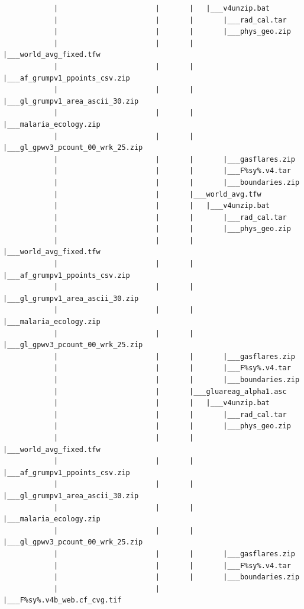\documentclass[]{book}
\begin{document}
\begin{verbatim}
            |                       |       |   |___v4unzip.bat
            |                       |       |       |___rad_cal.tar
            |                       |       |       |___phys_geo.zip
            |                       |       |       |___world_avg_fixed.tfw
            |                       |       |       |___af_grumpv1_ppoints_csv.zip
            |                       |       |       |___gl_grumpv1_area_ascii_30.zip
            |                       |       |       |___malaria_ecology.zip
            |                       |       |       |___gl_gpwv3_pcount_00_wrk_25.zip
            |                       |       |       |___gasflares.zip
            |                       |       |       |___F%sy%.v4.tar
            |                       |       |       |___boundaries.zip
            |                       |       |___world_avg.tfw
            |                       |       |   |___v4unzip.bat
            |                       |       |       |___rad_cal.tar
            |                       |       |       |___phys_geo.zip
            |                       |       |       |___world_avg_fixed.tfw
            |                       |       |       |___af_grumpv1_ppoints_csv.zip
            |                       |       |       |___gl_grumpv1_area_ascii_30.zip
            |                       |       |       |___malaria_ecology.zip
            |                       |       |       |___gl_gpwv3_pcount_00_wrk_25.zip
            |                       |       |       |___gasflares.zip
            |                       |       |       |___F%sy%.v4.tar
            |                       |       |       |___boundaries.zip
            |                       |       |___gluareag_alpha1.asc
            |                       |       |   |___v4unzip.bat
            |                       |       |       |___rad_cal.tar
            |                       |       |       |___phys_geo.zip
            |                       |       |       |___world_avg_fixed.tfw
            |                       |       |       |___af_grumpv1_ppoints_csv.zip
            |                       |       |       |___gl_grumpv1_area_ascii_30.zip
            |                       |       |       |___malaria_ecology.zip
            |                       |       |       |___gl_gpwv3_pcount_00_wrk_25.zip
            |                       |       |       |___gasflares.zip
            |                       |       |       |___F%sy%.v4.tar
            |                       |       |       |___boundaries.zip
            |                       |       |___F%sy%.v4b_web.cf_cvg.tif

\end{verbatim}
\end{document}

